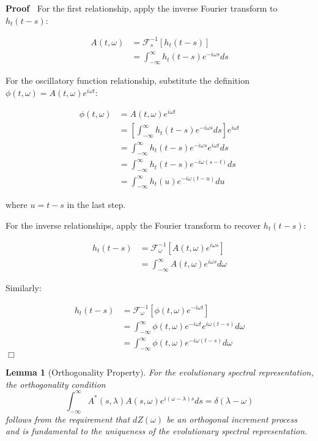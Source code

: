 \documentclass{article}
\newenvironment{proof}{\noindent\textbf{Proof\ }}{\hspace*{\fill}$\Box$\medskip}
\newtheorem{lemma}{Lemma}
\begin{document}
\begin{proof}
  For the first relationship, apply the inverse Fourier transform to $h_t  (t
  - s)$:
  
  \begin{align}
    A (t, \omega) & =\mathcal{F}_s^{- 1}  [h_t (t - s)] \\
    & = \int_{- \infty}^{\infty} h_t  (t - s) e^{- i \omega s} ds 
  \end{align}
  
  For the oscillatory function relationship, substitute the definition $\phi
  (t, \omega) = A (t, \omega) e^{i \omega t}$:
  
  \begin{align}
    \phi (t, \omega) & = A (t, \omega) e^{i \omega t} \\
    & = \left[ \int_{- \infty}^{\infty} h_t (t - s) e^{- i \omega s} ds
    \right] e^{i \omega t} \\
    & = \int_{- \infty}^{\infty} h_t  (t - s) e^{- i \omega s} e^{i \omega t}
    ds \\
    & = \int_{- \infty}^{\infty} h_t  (t - s) e^{- i \omega (s - t)} ds \\
    & = \int_{- \infty}^{\infty} h_t (u) e^{- i \omega (t - u)} du 
  \end{align}
  
  where $u = t - s$ in the last step.
  
  For the inverse relationships, apply the Fourier transform to recover $h_t 
  (t - s)$:
  
  \begin{align}
    h_t  (t - s) & =\mathcal{F}_{\omega}^{- 1}  [A (t, \omega) e^{i \omega s}]
    \\
    & = \int_{- \infty}^{\infty} A (t, \omega) e^{i \omega s} d \omega 
  \end{align}
  
  Similarly:
  
  \begin{align}
    h_t  (t - s) & =\mathcal{F}_{\omega}^{- 1}  [\phi (t, \omega) e^{- i
    \omega t}] \\
    & = \int_{- \infty}^{\infty} \phi (t, \omega) e^{- i \omega t} e^{i
    \omega (t - s)} d \omega \\
    & = \int_{- \infty}^{\infty} \phi (t, \omega) e^{- i \omega (t - s)} d
    \omega 
  \end{align}
\end{proof}

\begin{lemma}
  [Orthogonality Property] For the evolutionary spectral representation, the
  orthogonality condition
  \begin{equation}
    \int_{- \infty}^{\infty} A^{\ast} (s, \lambda) A (s, \omega) e^{i (\omega - \lambda)
    s} ds = \delta (\lambda - \omega)
  \end{equation}
  follows from the requirement that $dZ (\omega)$ be an orthogonal increment
  process and is fundamental to the uniqueness of the evolutionary spectral representation.
\end{lemma}
\end{document}
